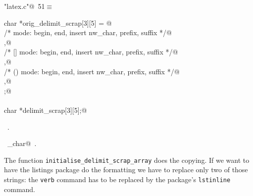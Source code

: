 \documentclass[a4paper]{report}
\begin{document}
\begin{flushleft} \small
\begin{minipage}{\linewidth}\label{scrap98}\raggedright\small
{} \verb@"latex.c"@\nobreak\ {\footnotesize {51}}$\equiv$
\vspace{-1ex}
\begin{list}{}{} \item
\mbox{}\verb@static char *orig_delimit_scrap[3][5] = {@\\
\mbox{}\verb@  /* {} mode: begin, end, insert nw_char, prefix, suffix */@\\
\mbox{},@\\
\mbox{}\verb@  /* [] mode: begin, end, insert nw_char, prefix, suffix */@\\
\mbox{},@\\
\mbox{}\verb@  /* () mode: begin, end, insert nw_char, prefix, suffix */@\\
\mbox{},@\\
\mbox{}\verb@};@\\
\mbox{}\verb@@\\
\mbox{}\verb@static char *delimit_scrap[3][5];@\\
\mbox{}\verb@@{\NWsep}
\end{list}
\vspace{-1.5ex}
\footnotesize
\begin{list}{}{\setlength{\itemsep}{-\parsep}\setlength{\itemindent}{-\leftmargin}}
\item \NWtxtFileDefBy\ .
\item \NWtxtIdentsUsed\nobreak\  \verb@nw_char@\nobreak\ .
\item{}
\end{list}
\end{minipage}\vspace{4ex}
\end{flushleft}
The function \texttt{initialise\_delimit\_scrap\_array} does the
copying. If we want to have the listings package 
do the formatting we have to replace only two of those strings: the
\texttt{verb} command has to be replaced by the package's \texttt{lstinline}
command.
\end{document}
